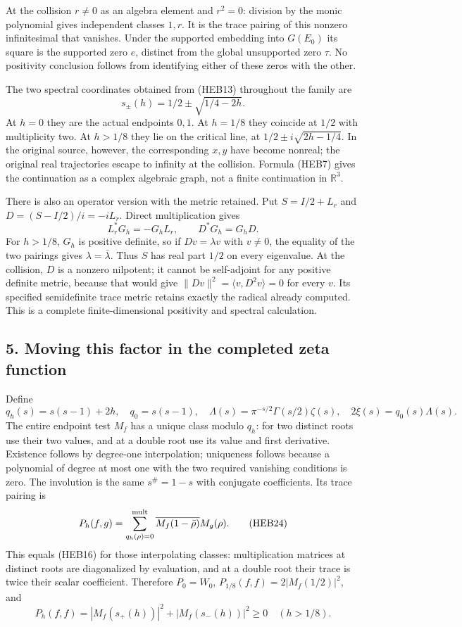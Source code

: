\documentclass[
  10pt,
  a4paper,
]{article}
\begin{document}
At the collision \(r\ne0\) as an algebra element and \(r^2=0\): division
by the monic polynomial gives independent classes \(1,r\). It is the
trace pairing of this nonzero infinitesimal that vanishes. Under the
supported embedding into \(G(E_0)\) its square is the supported zero
\(e\), distinct from the global unsupported zero \(\tau\). No positivity
conclusion follows from identifying either of these zeros with the
other.

The two spectral coordinates obtained from (HEB13) throughout the family
are \[
s_\pm(h)=1/2\pm\sqrt{1/4-2h}.
\tag{HEB21}
\] At \(h=0\) they are the actual endpoints \(0,1\). At \(h=1/8\) they
coincide at \(1/2\) with multiplicity two. At \(h>1/8\) they lie on the
critical line, at \(1/2\pm i\sqrt{2h-1/4}\). In the original source,
however, the corresponding \(x,y\) have become nonreal; the original
real trajectories escape to infinity at the collision. Formula (HEB7)
gives the continuation as a complex algebraic graph, not a finite
continuation in \(\mathbb R^3\).

There is also an operator version with the metric retained. Put
\(S=I/2+L_r\) and \(D=(S-I/2)/i=-iL_r\). Direct multiplication gives \[
L_r^*G_h=-G_hL_r,\qquad D^*G_h=G_hD.
\tag{HEB22}
\] For \(h>1/8\), \(G_h\) is positive definite, so if \(Dv=\lambda v\)
with \(v\ne0\), the equality of the two pairings gives
\(\lambda=\bar\lambda\). Thus \(S\) has real part \(1/2\) on every
eigenvalue. At the collision, \(D\) is a nonzero nilpotent; it cannot be
self-adjoint for any positive definite metric, because that would give
\(\|Dv\|^2=\langle v,D^2v\rangle=0\) for every \(v\). Its specified
semidefinite trace metric retains exactly the radical already computed.
This is a complete finite-dimensional positivity and spectral
calculation.

\subsection{5. Moving this factor in the completed zeta
function}\label{moving-this-factor-in-the-completed-zeta-function}

Define \[
q_h(s)=s(s-1)+2h,\quad q_0=s(s-1),\quad
\Lambda(s)=\pi^{-s/2}\Gamma(s/2)\zeta(s),\quad
2\xi(s)=q_0(s)\Lambda(s).
\tag{HEB23}
\] The entire endpoint test \(M_f\) has a unique class modulo \(q_h\):
for two distinct roots use their two values, and at a double root use
its value and first derivative. Existence follows by degree-one
interpolation; uniqueness follows because a polynomial of degree at most
one with the two required vanishing conditions is zero. The involution
is the same \(s^\#=1-s\) with conjugate coefficients. Its trace pairing
is \[
P_h(f,g)=\sum_{q_h(\rho)=0}^{\rm mult}
\overline{M_f(1-\bar\rho)}M_g(\rho).
\tag{HEB24}
\] This equals (HEB16) for those interpolating classes: multiplication
matrices at distinct roots are diagonalized by evaluation, and at a
double root their trace is twice their scalar coefficient. Therefore
\(P_0=W_0\), \(P_{1/8}(f,f)=2|M_f(1/2)|^2\), and \[
P_h(f,f)=|M_f(s_+(h))|^2+|M_f(s_-(h))|^2\ge0
\quad(h>1/8).
\tag{HEB25}
\]
\end{document}
